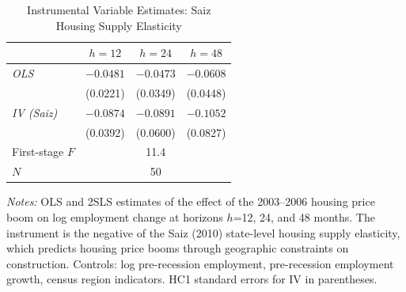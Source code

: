 \begin{table}[H]
\centering
\caption{Instrumental Variable Estimates: Saiz Housing Supply Elasticity}
\begin{threeparttable}
\begin{tabular}{lccc}
\toprule
& $h=12$ & $h=24$ & $h=48$ \\
\midrule
\textit{OLS} & $-0.0481$ & $-0.0473$ & $-0.0608$ \\
 & (0.0221) & (0.0349) & (0.0448) \\[4pt]
\textit{IV (Saiz)} & $-0.0874$ & $-0.0891$ & $-0.1052$ \\
 & (0.0392) & (0.0600) & (0.0827) \\
\midrule
First-stage $F$ & \multicolumn{3}{c}{11.4} \\
\midrule
$N$ & \multicolumn{3}{c}{50} \\
\bottomrule
\end{tabular}
\begin{tablenotes}[flushleft]
\small
\item \textit{Notes:} OLS and 2SLS estimates of the effect of the 2003--2006 housing price boom on log employment change at horizons $h$=12, 24, and 48 months. The instrument is the negative of the Saiz (2010) state-level housing supply elasticity, which predicts housing price booms through geographic constraints on construction. Controls: log pre-recession employment, pre-recession employment growth, census region indicators. HC1 standard errors for IV in parentheses.
\end{tablenotes}
\end{threeparttable}
\label{tab:iv}
\end{table}
